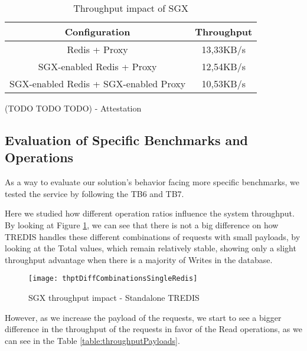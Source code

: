 \begin{table}[ht]
	\caption{Throughput impact of SGX} %
	\centering %
	\begin{tabular}{c c} %
		\hline\hline %
		\textbf{Configuration} & \textbf{Throughput} \\ [0.5ex] %
		\hline
		Redis + Proxy & 13,33KB/s\\
		\hline
		SGX-enabled Redis + Proxy & 12,54KB/s \\
		\hline %
		SGX-enabled Redis + SGX-enabled Proxy & 10,53KB/s\\ [1ex] %
		\hline %
	\end{tabular}
	\label{table:throughputSingleRedis} %
\end{table}

(TODO TODO TODO) - Attestation

\subsection{Evaluation of Specific Benchmarks and Operations}

As a way to evaluate our solution's behavior facing more specific benchmarks, we tested the service by following the TB6 and TB7. 

Here we studied how different operation ratios influence the system throughput. By looking at Figure \ref{fig:thptDiffCombinationsSingleRedis}, we can see that there is not a big difference on how TREDIS handles these different combinations of requests with small payloads, by looking at the Total values, which remain relatively stable, showing only a slight throughput advantage when there is a majority of Writes in the database.

\begin{figure}[htbp]
	\centering
	{\texttt{[image: thptDiffCombinationsSingleRedis]}}
	\caption{SGX throughput impact - Standalone TREDIS}
	\label{fig:thptDiffCombinationsSingleRedis}
\end{figure}

However, as we increase the payload of the requests, we start to see a bigger difference in the throughput of the requests in favor of the Read operations, as we can see in the Table \ref{table:throughputPayloads}.

